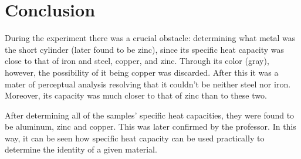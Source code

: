 \documentclass{article}
\begin{document}
\section{Conclusion}

During the experiment there was a crucial obstacle: determining what metal was the short cylinder (later found to be zinc), since its specific heat capacity was close to that of iron and steel, copper, and zinc. Through its color (gray), however, the possibility of it being copper was discarded. After this it was a mater of perceptual analysis resolving that it couldn't be neither steel nor iron. Moreover, its capacity was much closer to that of zinc than to these two. 

After determining all of the samples' specific heat capacities, they were found to be aluminum, zinc and copper. This was later confirmed by the professor. In this way, it can be seen how specific heat capacity can be used practically to determine the identity of a given material. 






\end{document}
